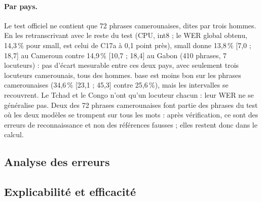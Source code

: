 \paragraph{Par pays.} Le test officiel ne contient que 72 phrases camerounaises, dites par trois
hommes. En les retranscrivant avec le reste du test (CPU, int8 ; le WER global obtenu,
14,3\,\% pour small, est celui de C17a à 0,1 point près), small donne 13,8\,\%
[7,0 ; 18,7] au Cameroun contre 14,9\,\% [10,7 ; 18,4] au Gabon (410 phrases, 7 locuteurs) :
pas d'écart mesurable entre ces deux pays, avec seulement trois locuteurs camerounais, tous des
hommes. base est moins bon sur les phrases camerounaises (34,6\,\% [23,1 ; 45,3] contre
25,6\,\%), mais les intervalles se recouvrent. Le Tchad et le Congo n'ont qu'un locuteur
chacun : leur WER ne se généralise pas. Deux des 72 phrases camerounaises font partie des
phrases du test où les deux modèles se trompent sur tous les mots : après vérification, ce sont
des erreurs de reconnaissance et non des références fausses ; elles restent donc dans le calcul.


\subsection{Analyse des erreurs}
\label{sec:res-erreurs}


\subsection{Explicabilité et efficacité}
\label{sec:res-explicabilite}


